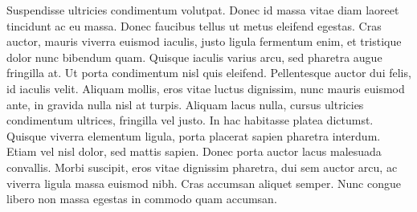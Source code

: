 Suspendisse ultricies condimentum volutpat. Donec id massa vitae diam laoreet tincidunt ac eu massa. Donec faucibus tellus ut metus eleifend egestas. Cras auctor, mauris viverra euismod iaculis, justo ligula fermentum enim, et tristique dolor nunc bibendum quam. Quisque iaculis varius arcu, sed pharetra augue fringilla at. Ut porta condimentum nisl quis eleifend. Pellentesque auctor dui felis, id iaculis velit. Aliquam mollis, eros vitae luctus dignissim, nunc mauris euismod ante, in gravida nulla nisl at turpis. Aliquam lacus nulla, cursus ultricies condimentum ultrices, fringilla vel justo. In hac habitasse platea dictumst. Quisque viverra elementum ligula, porta placerat sapien pharetra interdum. Etiam vel nisl dolor, sed mattis sapien. Donec porta auctor lacus malesuada convallis. Morbi suscipit, eros vitae dignissim pharetra, dui sem auctor arcu, ac viverra ligula massa euismod nibh. Cras accumsan aliquet semper. Nunc congue libero non massa egestas in commodo quam accumsan. 